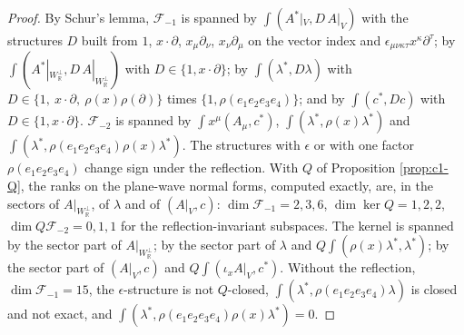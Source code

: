 \begin{proof}
By Schur's lemma, $\mathcal F_{-1}$ is spanned by $\int(A^*|_V,D\,A|_V)$ with the structures $D$ built from $1$, $x\cdot\partial$, $x_\mu\partial_\nu$, $x_\nu\partial_\mu$ on the vector index and $\epsilon_{\mu\nu\kappa\tau}x^\kappa\partial^\tau$; by $\int(A^*|_{W_{\mathbb R}^\perp},D\,A|_{W_{\mathbb R}^\perp})$ with $D\in\{1,x\cdot\partial\}$; by $\int(\lambda^*,D\lambda)$ with $D\in\{1,\ x\cdot\partial,\ \rho(x)\rho(\partial)\}$ times $\{1,\rho(e_1e_2e_3e_4)\}$; and by $\int(c^*,Dc)$ with $D\in\{1,x\cdot\partial\}$. $\mathcal F_{-2}$ is spanned by $\int x^\mu(A_\mu,c^*)$, $\int(\lambda^*,\rho(x)\lambda^*)$ and $\int(\lambda^*,\rho(e_1e_2e_3e_4)\rho(x)\lambda^*)$. The structures with $\epsilon$ or with one factor $\rho(e_1e_2e_3e_4)$ change sign under the reflection. With $Q$ of Proposition \ref{prop:c1-Q}, the ranks on the plane-wave normal forms, computed exactly, are, in the sectors of $A|_{W_{\mathbb R}^\perp}$, of $\lambda$ and of $(A|_V,c)$: $\dim\mathcal F_{-1}=2,3,6$, $\dim\ker Q=1,2,2$, $\dim Q\mathcal F_{-2}=0,1,1$ for the reflection-invariant subspaces. The kernel is spanned by the sector part of $A|_{W_{\mathbb R}^\perp}$; by the sector part of $\lambda$ and $Q\int(\rho(x)\lambda^*,\lambda^*)$; by the sector part of $(A|_V,c)$ and $Q\int(\iota_xA|_V,c^*)$. Without the reflection, $\dim\mathcal F_{-1}=15$, the $\epsilon$-structure is not $Q$-closed, $\int(\lambda^*,\rho(e_1e_2e_3e_4)\lambda)$ is closed and not exact, and $\int(\lambda^*,\rho(e_1e_2e_3e_4)\rho(x)\lambda^*)=0$.
\end{proof}

